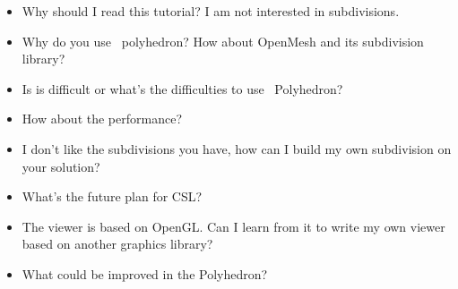 \documentclass[twocolumn]{article}
\begin{document}
\begin{itemize}

\item Why should I read this tutorial? I am not interested in subdivisions. 

\item Why do you use \cgal\  polyhedron? How about OpenMesh and its 
subdivision library?

\item Is is difficult or what's the difficulties to use \cgal\  Polyhedron?

\item How about the performance?

\item I don't like the subdivisions you have, how can I build my own 
      subdivision on your solution?

\item What's the future plan for CSL? 

\item The viewer is based on OpenGL. Can I learn from it
      to write my own viewer based on another graphics library?
      
\item What could be improved in the Polyhedron?

\end{itemize}
\end{document}
